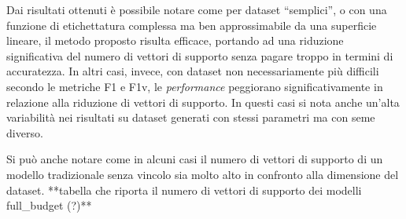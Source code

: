 Dai risultati ottenuti è possibile notare come per dataset ``semplici'', o con una funzione di etichettatura complessa ma ben approssimabile da una superficie lineare, il metodo proposto risulta efficace, portando ad una riduzione significativa del numero di vettori di supporto senza pagare troppo in termini di accuratezza.
In altri casi, invece, con dataset non necessariamente più difficili secondo le metriche F1 e F1v, le \emph{performance} peggiorano significativamente in relazione alla riduzione di vettori di supporto. In questi casi si nota anche un'alta variabilità nei risultati su dataset generati con stessi parametri ma con seme diverso.

Si può anche notare come in alcuni casi il numero di vettori di supporto di un modello tradizionale senza vincolo sia molto alto in confronto alla dimensione del dataset.
**tabella che riporta il numero di vettori di supporto dei modelli full\_budget (?)**

